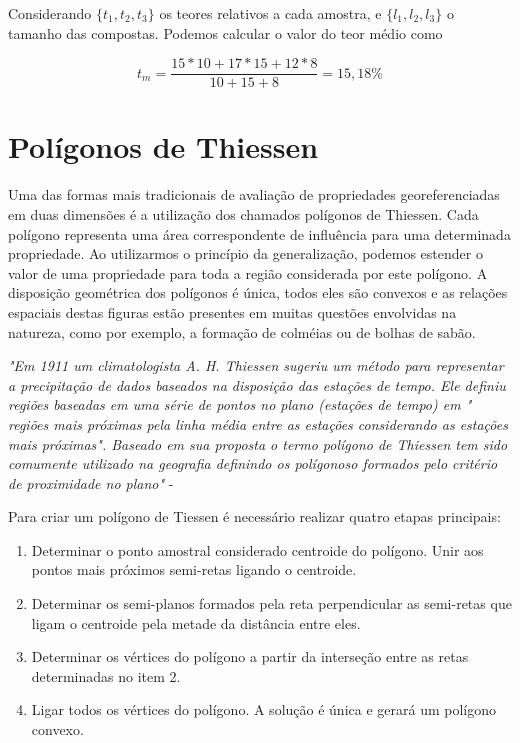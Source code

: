 Considerando $\{t_{1}, t_{2}, t_{3}\}$ os teores relativos a cada amostra, e $\{l_{1}, l_{2}, l_{3}\}$ o tamanho das compostas. Podemos calcular o valor do teor médio como

\begin{equation}
	t_{m} = \frac{15*10 + 17*15 + 12*8}{10+15+8} = 15,18\%
\end{equation}

    
\section{Polígonos de Thiessen} 

Uma das formas mais tradicionais de avaliação de propriedades georeferenciadas em duas dimensões é a utilização dos chamados polígonos de Thiessen. Cada polígono representa uma área correspondente de influência para uma determinada propriedade. Ao utilizarmos o princípio da generalização, podemos estender o valor de uma propriedade para toda a região considerada por este polígono. A disposição geométrica dos polígonos é única, todos eles são convexos e as relações espaciais destas figuras estão presentes em muitas questões envolvidas na natureza, como por exemplo, a formação de colméias ou de bolhas de sabão. 

\begin{proposition}
	\textit{"Em 1911 um climatologista A. H. Thiessen sugeriu um método para representar a precipitação de dados baseados na disposição das estações de tempo. Ele definiu regiões baseadas em uma série de pontos no plano (estações de tempo) em " regiões mais próximas pela linha média entre as estações considerando as estações mais próximas". Baseado em sua proposta o termo polígono de Thiessen tem sido comumente utilizado na geografia definindo os polígonoso formados pelo critério de proximidade no plano"} -\cite{brassel1979procedure} 
\end{proposition}

Para criar um polígono de Tiessen é necessário realizar quatro etapas principais:

\begin{enumerate}
	\item Determinar o ponto amostral considerado centroide do polígono. Unir aos pontos mais próximos semi-retas ligando o centroide. 
	\item Determinar os semi-planos formados pela reta perpendicular as semi-retas que ligam o centroide pela metade da distância entre eles. 
	\item Determinar os vértices do polígono a partir da interseção entre as retas determinadas no item 2.
	\item Ligar todos os vértices do polígono. A solução é única e gerará um polígono convexo.
\end{enumerate}




